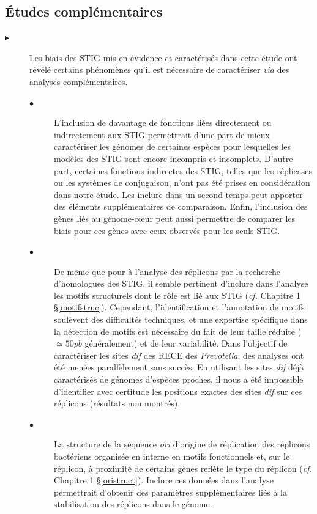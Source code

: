 \subsection{Études complémentaires}
\begin{description}
\item[$\blacktriangleright$] Les biais des STIG mis en évidence et caractérisés dans cette étude ont révélé certains phénomènes qu'il est nécessaire de caractériser \textit{via} des analyses complémentaires.
    \begin{description}
     \item[$\bullet$] L'inclusion de davantage de fonctions liées directement ou indirectement aux STIG permettrait d'une part de mieux caractériser les génomes de certaines espèces pour lesquelles les modèles des STIG sont encore incompris et incomplets. D'autre part, certaines fonctions indirectes des STIG, telles que les réplicases ou les systèmes de conjugaison, n'ont pas été prises en considération dans notre étude. Les inclure dans un second temps peut apporter des éléments supplémentaires de comparaison. Enfin, l'inclusion des gènes liés au génome-cœur peut aussi permettre de comparer les biais pour ces gènes avec ceux observés pour les seuls STIG.
     \item[$\bullet$] De même que pour à l'analyse des réplicons par la recherche d'homologues des STIG, il semble pertinent d'inclure dans l'analyse les motifs structurels dont le rôle est lié aux STIG (\textit{cf.} Chapitre 1 \S \ref{motifstruc}). Cependant, l'identification et l'annotation de motifs soulèvent des difficultés techniques, et une expertise spécifique dans la détection de motifs est nécessaire du fait de leur taille réduite ($\simeq 50 pb$ généralement) et de leur variabilité. Dans l'objectif de caractériser les sites \textit{dif} des RECE des \textit{Prevotella}, des analyses ont été menées parallèlement sans succès. En utilisant les sites \textit{dif} déjà caractérisés de génomes d'espèces proches, il nous a été impossible d'identifier avec certitude les positions exactes des sites \textit{dif} sur ces réplicons (résultats non montrés).
     \item[$\bullet$] La structure de la séquence \textit{ori} d'origine de réplication des réplicons bactériens organisée en interne en motifs fonctionnels et, sur le réplicon, à proximité de certains gènes refléte le type du réplicon (\textit{cf.} Chapitre 1 \S \ref{oristruct}). Inclure ces données dans l'analyse permettrait d'obtenir des paramètres supplémentaires liés à la stabilisation des réplicons dans le génome.
    \end{description}	
     

\end{description}
